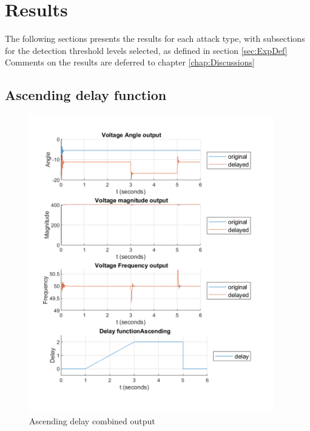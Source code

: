 \chapter{Results} \label{chap:Results}


The following sections presents the results for each attack type, with subsections for the detection threshold levels selected, as defined in section \ref{sec:ExpDef} \\ 

Comments on the results are deferred to chapter \ref{chap:Discussions}
\newpage
\section{Ascending delay function}
\begin{figure}[hb]
    \includegraphics[width=0.95\textwidth]{figures/v_AllFig-DelayOf_2-Ascending.png}    
    \caption{Ascending delay combined output}
    \label{fig:simPMU-allfig}
\end{figure}


